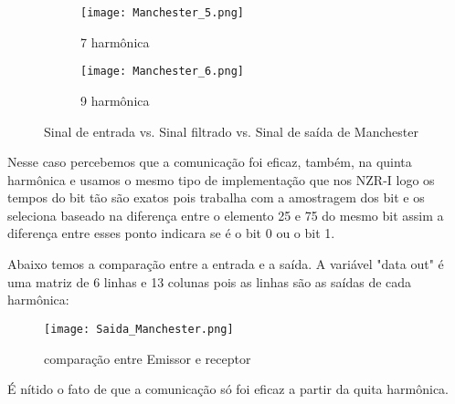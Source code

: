 \documentclass{article}
\begin{document}
            \begin{figure}[H]
                \begin{multicols}{2}
                    \begin{figure}[H]
                        \begin{center}
                            \texttt{[image: Manchester\_5.png]}
                            \caption{7 harmônica}
                            \label{fig:Manchester_5}
                        \end{center}
                    \end{figure}
                    \begin{figure}[H]
                        \begin{center}
                            \texttt{[image: Manchester\_6.png]}
                            \caption{9 harmônica}
                            \label{fig:Manchester_6}
                        \end{center}
                    \end{figure}
                \end{multicols}
                \caption{Sinal de entrada vs. Sinal filtrado vs. Sinal de saída de Manchester}
                \label{fig:Manchester}
            \end{figure}
            Nesse caso percebemos que a comunicação foi eficaz, também, na quinta harmônica e usamos o mesmo tipo de implementação que nos NZR-I logo os tempos do bit tão são exatos pois trabalha com a amostragem dos bit e os seleciona baseado na diferença entre o elemento 25 e 75 do mesmo bit assim a diferença entre esses ponto indicara se é o bit 0 ou o bit 1.
            
            Abaixo temos a comparação entre a entrada e a saída. A variável "data out" é uma matriz de 6 linhas e 13 colunas pois as linhas são as saídas de cada harmônica:
            \begin{figure}[H]
                \begin{center}
                    \texttt{[image: Saida\_Manchester.png]}
                    \caption{comparação entre Emissor e receptor}
                    \label{fig:Saida_Manchester}
                \end{center}
            \end{figure}
            É nítido o fato de que a comunicação só foi eficaz a partir da quita harmônica.
\end{document}
